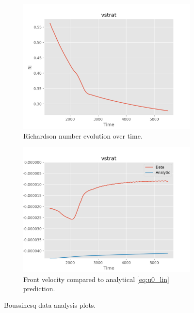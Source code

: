 \documentclass[twocolumn,
        usenames, %
        dvipsnames %
    ]{revtex4-1}%
\begin{document}
\begin{figure}[t]
    \centering
    \begin{subfigure}{0.5\textwidth}
        \centering
        \includegraphics[width=\textwidth]{plots/vstrat_ri.png}
        \caption{Richardson number evolution over time.}
    \end{subfigure}

    \begin{subfigure}{0.5\textwidth}
        \centering
        \includegraphics[width=\textwidth]{plots/vstrat_front_v.png}
        \caption{Front velocity compared to analytical \autoref{eq:u0_lin}
        prediction.}
    \end{subfigure}
    \caption{Boussinesq data analysis plots.}\label{fig:bouss}
\end{figure}
\end{document}
